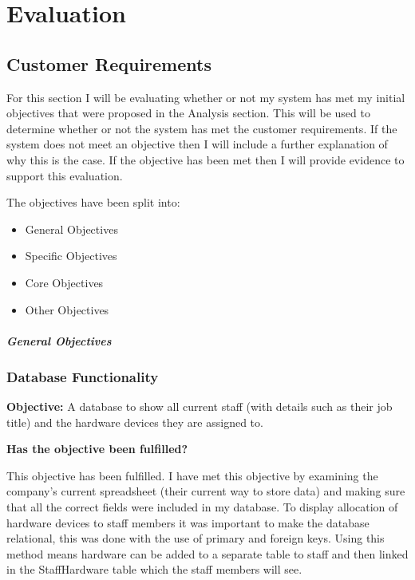 \chapter{Evaluation}

\section{Customer Requirements}

For this section I will be evaluating whether or not my system has met my initial objectives that were proposed in the Analysis section. This will be used to determine whether or not the system has met the customer requirements. If the system does not meet an objective then I will include a further explanation of why this is the case. If the objective has been met then I will provide evidence to support this evaluation.

The objectives have been split into:
\begin{itemize}
\item{General Objectives}
\item{Specific Objectives}
\item{Core Objectives}
\item{Other Objectives}
\end{itemize}

\paragraph{General Objectives}

\subsection{Database Functionality}

\textbf{Objective:} A database to show all current staff (with details such as their job title) and the hardware devices they are assigned to.

\textbf{Has the objective been fulfilled?}

This objective has been fulfilled. I have met this objective by examining the company's current spreadsheet (their current way to store data) and making sure that all the correct fields were included in my database. To display allocation of hardware devices to staff members it was important to make the database relational, this was done with the use of primary and foreign keys. Using this method means hardware can be added to a separate table to staff and then linked in the StaffHardware table which the staff members will see.

